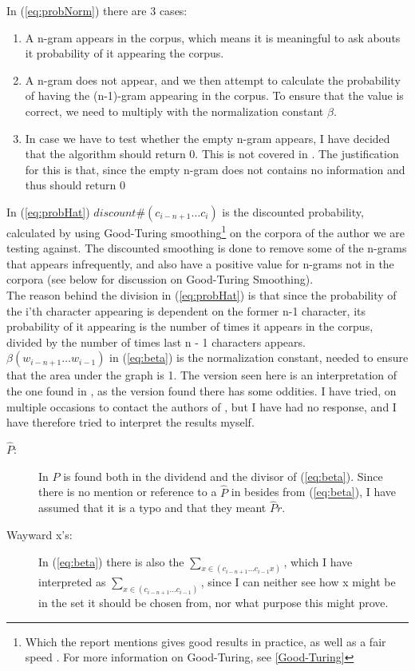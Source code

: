 In (\ref{eq:probNorm}) there are 3 cases:
\begin{enumerate}
\item A n-gram appears in the corpus, which means it is meaningful to ask abouts it probability of it appearing the corpus.
\item  A n-gram does not appear, and we then attempt to calculate the probability of having the (n-1)-gram appearing in the corpus. To ensure that the value is correct, we need to multiply with the normalization constant $\beta$. 
\item In case we have to test whether the empty n-gram appears, I have decided that the algorithm should return 0. This is not covered in \cite{nr4}. The justification for this is that, since the empty n-gram does not contains no information and thus should return 0
\end{enumerate}
In (\ref{eq:probHat}) $discount\#(c_{i - n + 1} \ldots c_{i})$ 
is the discounted probability, calculated by using Good-Turing smoothing\footnote{Which the report mentions gives good results in practice, as well as a fair speed \cite{nr4}. For more information on Good-Turing, see \ref{Good-Turing}} on the corpora of the author we are testing against. The discounted smoothing is done to remove some of the n-grams that appears infrequently, and also have a positive value for n-grams not in the corpora (see below for discussion on Good-Turing Smoothing).\\

The reason behind the division in (\ref{eq:probHat}) is that since the probability of the i'th character appearing is dependent on the former n-1 character, its probability of it appearing is the number of times it appears in the corpus, divided by the number of times last n - 1 characters appears.\\

$\beta (w_{i - n + 1}\ldots w_{i -1})$ in (\ref{eq:beta}) is the normalization constant, needed to ensure that the area under the graph is 1. The version seen here is an interpretation of the one found in \cite{nr4}, as the version found there has some oddities. I have tried, on multiple occasions to contact the authors of \cite{nr4}, but I have had no response, and I have therefore tried to interpret the results myself.
\begin{description}
\item[$\hat{P}$:]  In \cite{nr4} $\hat{P}$ is found  both in the dividend and the divisor of (\ref{eq:beta}). Since there is no mention or reference to a $\hat{P}$ in \cite{nr4} besides from (\ref{eq:beta}), I have assumed that it is a typo and that they meant $\hat{P}r$.
\item[Wayward x's:] In (\ref{eq:beta}) there is also the $\sum_{x \in (c_{i - n + 1} \ldots c_{i-1} x)}$, which I have interpreted as $\sum_{x \in (c_{i - n + 1} \ldots c_{i-1})}$, since I can neither see how x might be in the set it should be chosen from, nor what purpose this might prove.  
\end{description}

